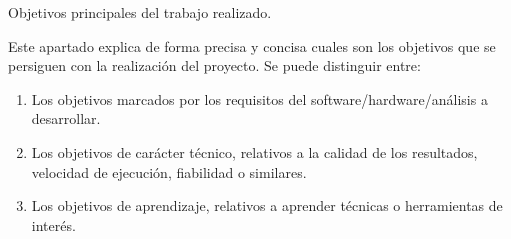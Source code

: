 
Objetivos principales del trabajo realizado.

Este apartado explica de forma precisa y concisa cuales son los objetivos que se persiguen con la realización del proyecto. Se puede distinguir entre:
\begin{enumerate}
    \item Los objetivos marcados por los requisitos del software/hardware/análisis a desarrollar.
    \item Los objetivos de carácter técnico, relativos a la calidad de los resultados, velocidad de ejecución, fiabilidad o similares.
    \item Los objetivos de aprendizaje, relativos a aprender técnicas o herramientas de interés. 
\end{enumerate}
